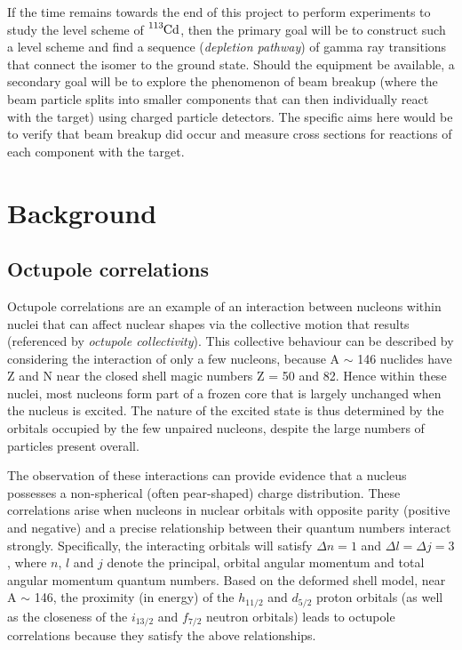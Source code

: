 \documentclass[12pt,a4paper]{article}
\begin{document}
\medskip
\noindent
If the time remains towards the end of this project to perform experiments to study the level scheme of $\ce{^{113}Cd}$, then the primary goal will be to construct such a level scheme and find a sequence (\textit{depletion pathway}) of gamma ray transitions that connect the isomer to the ground state.
Should the equipment be available, a  secondary goal will be to explore the phenomenon of beam breakup (where the beam particle splits into smaller components that can then individually react with the target) using charged particle detectors.
The specific aims here would be to verify that beam breakup did occur and measure cross sections for reactions of each component with the target.


\section*{Background}

\subsection*{Octupole correlations}
Octupole correlations are an example of an interaction between nucleons within nuclei that can affect nuclear shapes via the collective motion that results (referenced by \textit{octupole collectivity}).
This collective behaviour can be described by considering the interaction of only a few nucleons, because A $\sim$ 146 nuclides have Z and N near the closed shell magic numbers Z = 50 and 82.
Hence within these nuclei, most nucleons form part of a frozen core that is largely unchanged when the nucleus is excited.
The nature of the excited state is thus determined by the orbitals occupied by the few  unpaired nucleons, despite the large numbers of particles present overall.

\medskip
\noindent
The observation of these interactions can provide evidence that a nucleus possesses a non-spherical (often pear-shaped) charge distribution.
These correlations arise when nucleons in nuclear orbitals with opposite parity (positive and negative) and a precise relationship between their quantum numbers interact strongly.
Specifically, the interacting orbitals will satisfy $\Delta n = 1$ and $\Delta l = \Delta j = 3$, where $n$, $l$ and $j$ denote the principal, orbital angular momentum and total angular momentum quantum numbers.
Based on the deformed shell model, near A $\sim$ 146, the proximity (in energy) of the $h_{11/2}$ and $d_{5/2}$ proton orbitals (as well as the closeness of the $i_{13/2}$ and $f_{7/2}$ neutron orbitals) leads to octupole correlations because they satisfy the above relationships.
\end{document}
